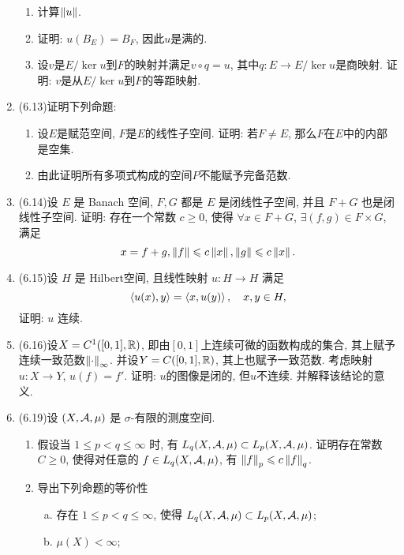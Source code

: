 \begin{enumerate}[label=\textbf{\arabic*.}, ref=\arabic*]
        \begin{enumerate}[(1)]
        \item 计算$ \left\| u \right\| $.
        \item 证明: $ u(B_E)=B_F $, 因此$ u $是满的.
        \item 设$ v $是$ E/\ker u $到$ F $的映射并满足$ v\circ q=u $, 其中$ q : E\to E/\ker u $是商映射. 证明: $ v $是从$ E/\ker u $到$ F $的等距映射. 
        \end{enumerate}
    \item (6.13)证明下列命题:
        \begin{enumerate}[(1)]
        \item 设$ E $是赋范空间, $ F $是$ E $的线性子空间. 证明: 若$ F\ne E $, 那么$ F $在$ E $中的内部是空集.
        \item 由此证明所有多项式构成的空间$ P $不能赋予完备范数. 
        \end{enumerate}
    \item (6.14)设 $ E $ 是 Banach 空间, $ F, G $ 都是 $ E $ 是闭线性子空间, 并且 $ F+G $ 也是闭线性子空间. 证明: 存在一个常数 $ c\geqslant0 $, 使得 $ \forall x\in F+G $, $ \exists(f, g)\in F\times G $, 满足 
        \[
            x=f+g, \left\| f \right\|\leqslant c\left\| x \right\|, \left\| g \right\|\leqslant c\left\| x \right\|.
        \]
    \item (6.15)设 $ H $ 是 Hilbert空间, 且线性映射 $ u:H\to H $ 满足
        \[
            \left\langle u(x), y \right\rangle=\left\langle x, u(y) \right\rangle, \quad x, y\in H,
        \]
        证明: $ u $ 连续. 
    \item (6.16)设$ X=C^1([0,1],\mathbb{R}) $, 即由$ [0,1] $上连续可微的函数构成的集合, 其上赋予连续一致范数$ \left\| \cdot \right\|_\infty $. 并设$ Y=C([0,1],\mathbb{R}) $, 其上也赋予一致范数. 考虑映射$ u : X\to Y $, $ u(f)=f' $. 证明: $ u $的图像是闭的, 但$ u $不连续. 并解释该结论的意义. 
    \item (6.19)设 $ (X, \mathcal{A}, \mu) $ 是 $ \sigma $-有限的测度空间.
        \begin{enumerate}[(1)]
            \item 假设当 $ 1\leqslant p<q\leqslant\infty $ 时, 有 $ L_{q}(X, \mathcal{A}, \mu)\subset L_{p}(X, \mathcal{A}, \mu) $. 证明存在常数 $ C\geqslant0 $, 使得对任意的 $ f\in L_{q}(X, \mathcal{A}, \mu) $, 有 $ \left\| f \right\|_{p}\leqslant c\left\| f \right\|_{q} $.
            \item 导出下列命题的等价性
            \begin{enumerate}[a. ]
                \item 存在 $ 1\leqslant p<q\leqslant\infty $, 使得 $ L_{q}(X, \mathcal{A}, \mu)\subset L_{p}(X, \mathcal{A}, \mu) $;
                \item $ \mu(X)<\infty $;

\end{enumerate}
\end{enumerate}
\end{enumerate}
